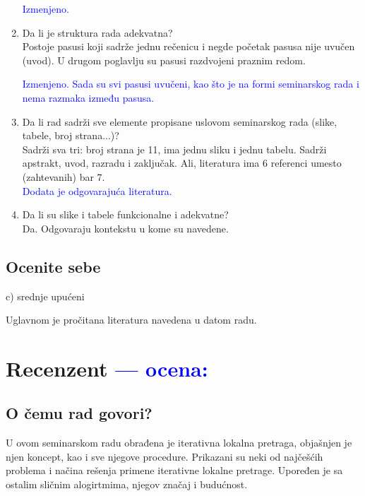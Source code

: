 \documentclass[a4paper]{report}
\newcommand{\odgovor}[1]{\textcolor{blue}{#1}}
\begin{document}
\begin{enumerate}
\odgovor{Izmenjeno.\\}

\item Da li je struktura rada adekvatna?\\
Postoje pasusi koji sadrže jednu rečenicu i negde početak pasusa nije uvučen (uvod). U drugom poglavlju su pasusi razdvojeni praznim redom.

\odgovor{Izmenjeno. Sada su svi pasusi uvučeni, kao što je na formi seminarskog rada i nema razmaka između pasusa.\\}
\item Da li rad sadrži sve elemente propisane uslovom seminarskog rada (slike, tabele, broj strana...)?\\
Sadrži sva tri: broj strana je 11, ima jednu sliku i jednu tabelu. Sadrži apstrakt, uvod, razradu i zaključak. Ali, literatura ima 6 referenci umesto (zahtevanih) bar 7.\\
\odgovor{Dodata je odgovarajuća literatura.\\}

\item Da li su slike i tabele funkcionalne i adekvatne?\\
Da. Odgovaraju kontekstu u kome su navedene.
\end{enumerate}

\section{Ocenite sebe}
c) srednje upućeni

Uglavnom je pročitana literatura navedena u datom radu.

\chapter{Recenzent \odgovor{--- ocena:} }


\section{O čemu rad govori?}

U ovom seminarskom radu obrađena je iterativna lokalna pretraga, objašnjen je njen koncept, kao i  sve njegove procedure. Prikazani su neki od najčešćih problema i načina rešenja primene iterativne lokalne pretrage. Upoređen je sa ostalim sličnim alogirtmima, njegov značaj i budućnost.
\end{document}
